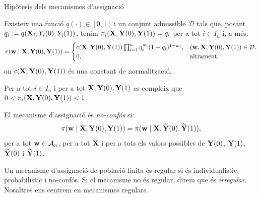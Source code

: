 \documentclass{bestbeamer}
\begin{document}
\begin{frame}[allowframebreaks]{Hipòtesis dels mecanismes d'assignació}\label{frame:mechipotesis}
\begin{definition}
Existeix una funció $q(\cdot)\in [0,1]$ i un conjunt admissible $\mathcal D$ tals que, posant $q_i:=q(\mathbf{X}_i,Y_i(0),Y_i(1))$, tenim $\pi_i(\mathbf{X},\mathbf{Y}(0),\mathbf{Y}(1))=q_i$ per a tot $i\in I_u$ i, a més,
\begin{equation*}
\pi(\mathbf{w}\mid \mathbf{X},\mathbf{Y}(0),\mathbf{Y}(1))
=
\begin{cases}
c(\mathbf{X},\mathbf{Y}(0),\mathbf{Y}(1))\prod_{i=1}^n q_i^{w_i}(1-q_i)^{1-w_i}, & (\mathbf{w},\mathbf{X},\mathbf{Y}(0),\mathbf{Y}(1))\in\mathcal D,\\
0, & \text{altrament}.
\end{cases}
\end{equation*}
on $c(\mathbf{X},\mathbf{Y}(0),\mathbf{Y}(1))$ és una constant de normalització.
\end{definition}
\begin{definition}
Per a tot $i\in I_{\mathrm{u}}$ i per a tot $\mathbf{X},\mathbf{Y}(0),\mathbf{Y}(1)$ es compleix que $0<\pi_i(\mathbf{X},\mathbf{Y}(0),\mathbf{Y}(1))<1$.
\end{definition}
\begin{definition}\label{def:noconfusio-mecanisme-finit}
El mecanisme d'assignació és \textit{no-confós} si:
\begin{equation*}
\pi(\mathbf{w}\mid \mathbf{X},\mathbf{Y}(0),\mathbf{Y}(1))
=
\pi(\mathbf{w}\mid \mathbf{X},\widetilde{\mathbf{Y}}(0),\widetilde{\mathbf{Y}}(1)),
\end{equation*}
per a tot $\mathbf{w}\in\mathcal A_n$, per a tot $\mathbf{X}$ i per a tots els valors possibles de $\mathbf{Y}(0)$, $\mathbf{Y}(1)$, $\widetilde{\mathbf{Y}}(0)$ i $\widetilde{\mathbf{Y}}(1)$.
\end{definition}
\begin{definition}
Un mecanisme d'assignació de població finita és regular si és individualístic, probabilístic i no-confós. Si el mecanisme no és regular, direm que és \textit{irregular}. Nosaltres ens centrem en mecanismes regulars.
\end{definition}
\end{frame}
\end{document}
